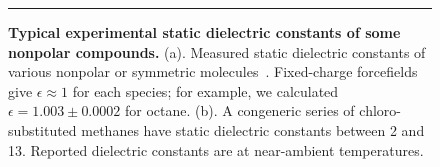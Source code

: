 \documentclass[aps,pre,twocolumn,nofootinbib,superscriptaddress,linenumbers]{revtex4-1}
\begin{document}
\begin{figure}


\noindent\rule{8cm}{0.4pt}


\caption{{\bf Typical experimental static dielectric constants of some nonpolar compounds.}
(a). Measured static dielectric constants of various nonpolar or symmetric molecules~\cite{d1990dielectric, haynes2011crc}.  
Fixed-charge forcefields give $\epsilon \approx 1$ for each species; for example, we calculated $\epsilon = 1.003 \pm 0.0002$ for octane.  
(b).  A congeneric series of chloro-substituted methanes have static dielectric constants between 2 and 13.  
Reported dielectric constants are at near-ambient temperatures.  
}
\label{figure:nonpolars}

\end{figure}
\end{document}
